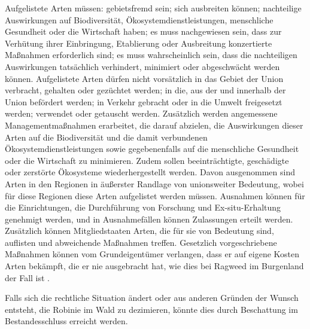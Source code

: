 \documentclass[twocolumn]{scrartcl}
\begin{document}
Aufgelistete Arten müssen: gebietsfremd sein; sich ausbreiten können;
nachteilige Auswirkungen auf Biodiversität, Ökosystemdienstleistungen,
menschliche Gesundheit oder die Wirtschaft haben; es muss nachgewiesen
sein, dass zur Verhütung ihrer Einbringung, Etablierung oder
Ausbreitung konzertierte Maßnahmen erforderlich sind; es muss
wahrscheinlich sein, dass die nachteiligen Auswirkungen tatsächlich
verhindert, minimiert oder abgeschwächt werden können. Aufgelistete
Arten dürfen nicht vorsätzlich in das Gebiet der Union verbracht,
gehalten oder gezüchtet werden; in die, aus der und innerhalb der
Union befördert werden; in Verkehr gebracht oder in die Umwelt
freigesetzt werden; verwendet oder getauscht werden. Zusätzlich werden
angemessene Managementmaßnahmen erarbeitet, die darauf abzielen, die
Auswirkungen dieser Arten auf die Biodiversität und die damit
verbundenen Ökosystemdienstleistungen sowie gegebenenfalls auf die
menschliche Gesundheit oder die Wirtschaft zu minimieren. Zudem sollen
beeinträchtigte, geschädigte oder zerstörte Ökosysteme
wiederhergestellt werden. Davon ausgenommen sind Arten in den Regionen
in äußerster Randlage von unionsweiter Bedeutung, wobei für diese
Regionen diese Arten aufgelistet werden müssen. Ausnahmen können für
die Einrichtungen, die Durchführung von Forschung und
Ex-situ-Erhaltung genehmigt werden, und in Ausnahmefällen können
Zulassungen erteilt werden. Zusätzlich können Mitgliedstaaten Arten,
die für sie von Bedeutung sind, auflisten und abweichende Maßnahmen
treffen. Gesetzlich vorgeschriebene Maßnahmen können vom
Grundeigentümer verlangen, dass er auf eigene Kosten Arten bekämpft,
die er nie ausgebracht hat, wie dies bei Ragweed im Burgenland der
Fall ist \citep{burgenland2021ragweed}.

Falls sich die rechtliche Situation ändert oder aus anderen Gründen
der Wunsch entsteht, die Robinie im Wald zu dezimieren, könnte dies
durch Beschattung im Bestandesschluss erreicht werden. %
\end{document}
